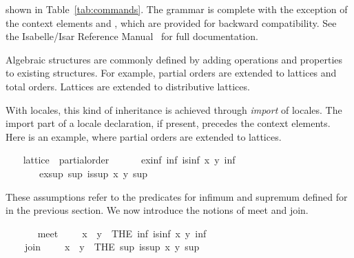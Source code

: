 \begin{isabellebody}
\begin{isamarkuptext}
  shown in Table~\ref{tab:commands}.  The grammar is complete with the
  exception of the context elements  and
  , which are provided for backward
  compatibility.  See the Isabelle/Isar Reference
  Manual~\cite{IsarRef} for full documentation.%
\end{isamarkuptext}%
\isamarkuptrue%
%
\isamarkuptrue%
%
\begin{isamarkuptext}%
Algebraic structures are commonly defined by adding operations and
  properties to existing structures.  For example, partial orders
  are extended to lattices and total orders.  Lattices are extended to
  distributive lattices.%
\end{isamarkuptext}%
\isamarkuptrue%
%
\begin{isamarkuptext}%
With locales, this kind of inheritance is achieved through
  \emph{import} of locales.  The import part of a locale declaration,
  if present, precedes the context elements.  Here is an example,
  where partial orders are extended to lattices.%
\end{isamarkuptext}%
\isamarkuptrue%
\ \ \isamarkupfalse%
\ lattice\ {\isacharequal}\ partial{\isacharunderscore}order\ {\isacharplus}\isanewline
\ \ \ \ \ ex{\isacharunderscore}inf{\isacharcolon}\ {\isachardoublequoteopen}{\isasymexists}inf{\isachardot}\ is{\isacharunderscore}inf\ x\ y\ inf{\isachardoublequoteclose}\isanewline
\ \ \ \ \ \ \ ex{\isacharunderscore}sup{\isacharcolon}\ {\isachardoublequoteopen}{\isasymexists}sup{\isachardot}\ is{\isacharunderscore}sup\ x\ y\ sup{\isachardoublequoteclose}\isanewline
\ \ %
\begin{isamarkuptext}%
These assumptions refer to the predicates for infimum
  and supremum defined for  in the previous
  section.  We now introduce the notions of meet and join.%
\end{isamarkuptext}%
\isamarkuptrue%
\ \ \isamarkupfalse%
\isanewline
\ \ \ \ meet\ {\isacharparenleft}\ {\isachardoublequoteopen}{\isasymsqinter}{\isachardoublequoteclose}\ {}{}{\isacharparenright}\ \ {\isachardoublequoteopen}x\ {\isasymsqinter}\ y\ {\isacharequal}\ {\isacharparenleft}THE\ inf{\isachardot}\ is{\isacharunderscore}inf\ x\ y\ inf{\isacharparenright}{\isachardoublequoteclose}\isanewline
\ \ \isamarkupfalse%
\isanewline
\ \ \ \ join\ {\isacharparenleft}\ {\isachardoublequoteopen}{\isasymsqunion}{\isachardoublequoteclose}\ {}{}{\isacharparenright}\ \ {\isachardoublequoteopen}x\ {\isasymsqunion}\ y\ {\isacharequal}\ {\isacharparenleft}THE\ sup{\isachardot}\ is{\isacharunderscore}sup\ x\ y\ sup{\isacharparenright}{\isachardoublequoteclose}\isanewline

\end{isabellebody}
